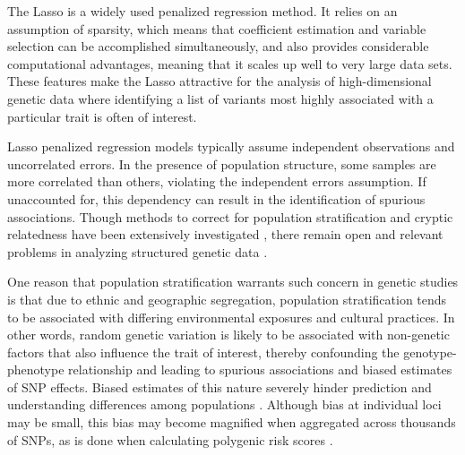 The Lasso \cite{tibshirani1996regression} is a widely used penalized regression method. It relies on an assumption of sparsity, which means that coefficient estimation and variable selection can be accomplished simultaneously, and also provides considerable computational advantages, meaning that it scales up well to very large data sets. These features make the Lasso attractive for the analysis of high-dimensional genetic data where identifying a list of variants most highly associated with a particular trait is often of interest.

Lasso penalized regression models typically assume independent observations and uncorrelated errors. In the presence of population structure, some samples are more correlated than others, violating the independent errors assumption. If unaccounted for, this dependency can result in the identification of spurious associations. Though methods to correct for population stratification and cryptic relatedness have been extensively investigated \cite{Amin2007, hoffman2013correcting, price2006principal, Rakitsch2012, bhatnagar2019simultaneous, Sillanpaeae2011}, there remain open and relevant problems  in analyzing structured genetic data \cite{lawson2019population, barton2019population}. 

One reason that population stratification warrants such concern in genetic studies is that due to ethnic and geographic segregation, population stratification tends to be associated with differing environmental exposures and cultural practices.  In other words, random genetic variation is likely to be associated with non-genetic factors that also influence the trait of interest, thereby confounding the genotype-phenotype relationship and leading to spurious associations and biased estimates of SNP effects. Biased estimates of this nature severely hinder prediction and understanding differences among populations \cite{barton2019population}. Although bias at individual loci may be small, this bias may become magnified when aggregated across thousands of SNPs, as is done when calculating polygenic risk scores \cite{barton2019population}.


